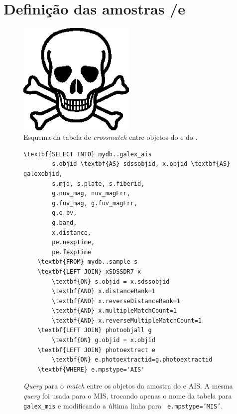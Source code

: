 \section{Definição das amostras \SDSS/\starlight e \galex}
\label{sec:Crossmatch:DefAmostras}


\begin{figure}
	\includegraphics[width=0.5\textwidth]{figuras/test.eps}
	\caption[Esquema da tabela de {em crossmatch} entre objetos do \galex e do
	\SDSS.]
	{Esquema da tabela de {\em crossmatch} entre objetos do \galex e do
	\SDSS.}
	\label{fig:TabelaxSDSSDR7}
\end{figure}

\begin{figure}
	\begin{Verbatim}[commandchars=\\\{\}]
	\textbf{SELECT INTO} mydb..galex_ais
		s.objid \textbf{AS} sdssobjid, x.objid \textbf{AS} galexobjid,
		s.mjd, s.plate, s.fiberid,
		g.nuv_mag, nuv_magErr,
		g.fuv_mag, g.fuv_magErr,
		g.e_bv,
		g.band,
		x.distance,
		pe.nexptime,
		pe.fexptime
	\textbf{FROM} mydb..sample s
	\textbf{LEFT JOIN} xSDSSDR7 x
		\textbf{ON} s.objid = x.sdssobjid
		\textbf{AND} x.distanceRank=1
		\textbf{AND} x.reverseDistanceRank=1
		\textbf{AND} x.multipleMatchCount=1
		\textbf{AND} x.reverseMultipleMatchCount=1
	\textbf{LEFT JOIN} photoobjall g
		\textbf{ON} g.objid = x.objid
	\textbf{LEFT JOIN} photoextract e
		\textbf{ON} e.photoextractid=g.photoextractid
	\textbf{WHERE} e.mpstype='AIS'
	\end{Verbatim}
	\caption[{\em Query} para o {\em match} entre os objetos da amostra do
	\starlight e \galex AIS.]
	{{\em Query} para o {\em match} entre os objetos da amostra do \starlight e
	\galex AIS. A mesma {\em query} foi usada para o MIS, trocando apenas o nome da
	tabela para {\tt galex\_mis} e modificando a última linha para {\tt
	e.mpstype='MIS'}.}
	\label{fig:QueryMatchAIS}
\end{figure}



